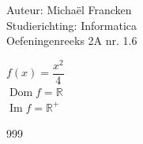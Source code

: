 \documentclass[a4paper]{article}
\begin{document}
\noindent \large Auteur: Michaël Francken \\
\noindent \large Studierichting: Informatica\\
\noindent \large Oefeningenreeks 2A nr. 1.6\\


\normalsize

$f(x)=\dfrac{x^2}{4}$\\

$\operatorname{Dom}f=\mathbb{R}$\\

$\operatorname{Im}f=\mathbb{R}^{+}$\\


\begin{thebibliography}{999}
\end{thebibliography}
\end{document}
